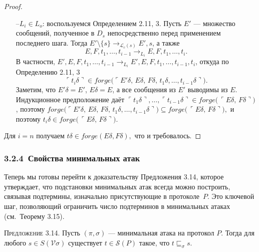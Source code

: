 \begin{proof}
\begin{itemize}
  \item[--$L_i\in L_o$:]
        воспользуемся Определением 2.11, 3.
        Пусть $E'$ — множество сообщений, полученное в $D_s$
        непосредственно перед применением последнего шага.
        Тогда
        $E'\setminus\{s\}\rightarrow_{\mathcal L_c(s)}E',s$,
        а также
        \[
          E,F,t_1,\dots,t_{i-1}\rightarrow_{L_i}
          E,F,t_1,\dots,t_i .
        \]
        В частности,
        $E',E,F,t_1,\dots,t_{i-1}\rightarrow_{L_i}E',E,F,t_1,\dots,t_{i-1},t_{i}$,
        откуда по Определению 2.11, 3
        \[
          \ulcorner t_i\delta\urcorner\in
          forge\!\bigl(
            \ulcorner E'\delta,\,
            E\delta,\,F\delta,\,
            t_1\delta,\dots,t_{i-1}\delta\urcorner
          \bigr).
        \]
        Заметим, что $E'\delta=E'$, $E\delta=E$,
        а все сообщения из $E'$ выводимы из $E$.
        Индукционное предположение даёт
        $\ulcorner t_1\delta \urcorner,\dots,\ulcorner t_{i-1}\delta \urcorner\in
         forge\!\bigl(\,\ulcorner E\delta,\,F\delta\urcorner\bigr)$,
        поэтому
        \(
          forge\!\bigl(
            \ulcorner E'\delta,\,
            E\delta,\,F\delta,\,
            t_1\delta,\dots,t_{i-1}\delta\urcorner
          \bigr)
          \subseteq
          forge\!\bigl(\,\ulcorner E\delta,\,F\delta\urcorner\bigr),
        \)
        и поэтому
        \(
          t_i\delta\in
           forge\!\bigl(\,\ulcorner E\delta,\,F\delta\urcorner\bigr).
        \)
\end{itemize}

Для $i=n$ получаем
\(
  t\delta\in forge(E\delta,F\delta),
\)
что и требовалось.
\end{proof}

\subsubsection*{3.2.4 \,Свойства минимальных атак}

Теперь мы готовы перейти к доказательству Предложения 3.14, которое утверждает, что
подстановки минимальных атак всегда можно построить,
связывая подтермины, изначально присутствующие в протоколе~$P$.
Это ключевой шаг, позволяющий ограничить число подтерминов
в минимальных атаках (см.\ Теорему 3.15).

\textsc{Предложение 3.14.}
Пусть $(\pi,\sigma)$ — минимальная атака на протокол $P$.
Тогда для любого
\(s\in S(\mathcal V\sigma)\)
существует
\(t\in \mathcal S(P)\) такое, что \(t\sqsubseteq_{\sigma}s\).

